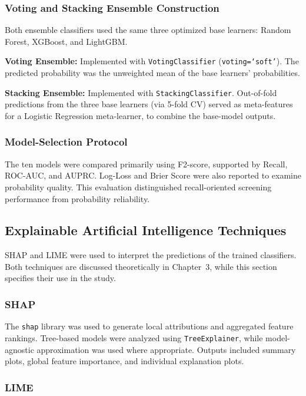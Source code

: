 \subsubsection{Voting and Stacking Ensemble Construction}

Both ensemble classifiers used the same three optimized base learners: Random Forest, XGBoost, and LightGBM.

\textbf{Voting Ensemble:} Implemented with \texttt{VotingClassifier} (\texttt{voting=`soft'}). The predicted probability was the unweighted mean of the base learners' probabilities.

\textbf{Stacking Ensemble:} Implemented with \texttt{StackingClassifier}. Out-of-fold predictions from the three base learners (via 5-fold CV) served as meta-features for a Logistic Regression meta-learner, to combine the base-model outputs.

\subsubsection{Model-Selection Protocol}

The ten models were compared primarily using F2-score, supported by Recall, ROC-AUC, and AUPRC. Log-Loss and Brier Score were also reported to examine probability quality. This evaluation distinguished recall-oriented screening performance from probability reliability.

\subsection{Explainable Artificial Intelligence Techniques}

SHAP and LIME were used to interpret the predictions of the trained classifiers. Both techniques are discussed theoretically in Chapter~3, while this section specifies their use in the study.

\subsubsection{SHAP}

The \texttt{shap} library was used to generate local attributions and aggregated feature rankings. Tree-based models were analyzed using \texttt{TreeExplainer}, while model-agnostic approximation was used where appropriate. Outputs included summary plots, global feature importance, and individual explanation plots.

\subsubsection{LIME}

